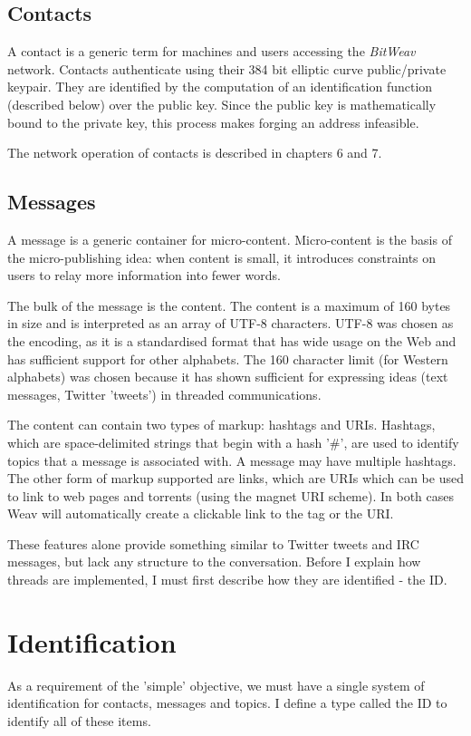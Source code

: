 \documentclass[10pt,a4paper,onecolumn]{article}
\begin{document}
\subsection{Contacts}
A contact is a generic term for machines and users accessing the \textit{BitWeav} network. Contacts authenticate using their 384 bit elliptic curve public/private keypair. They are identified by the computation of an identification function (described below) over the public key. Since the public key is mathematically bound to the private key, this process makes forging an address infeasible.

The network operation of contacts is described in chapters 6 and 7.

\subsection{Messages}
A message is a generic container for micro-content. Micro-content is the basis of the micro-publishing idea: when content is small, it introduces constraints on users to relay more information into fewer words.

The bulk of the message is the content. The content is a maximum of 160 bytes in size and is interpreted as an array of UTF-8 characters. UTF-8 was chosen as the encoding, as it is a standardised format that has wide usage on the Web and has sufficient support for other alphabets. The 160 character limit (for Western alphabets) was chosen because it has shown sufficient for expressing ideas (text messages, Twitter 'tweets') in threaded communications. 

The content can contain two types of markup: hashtags and URIs. Hashtags, which are space-delimited strings that begin with a hash '\#', are used to identify topics that a message is associated with. A message may have multiple hashtags. The other form of markup supported are links, which are URIs which can be used to link to web pages and torrents (using the magnet URI scheme). In both cases Weav will automatically create a clickable link to the tag or the URI.

These features alone provide something similar to Twitter tweets and IRC messages, but lack any structure to the conversation. Before I explain how threads are implemented, I must first describe how they are identified - the ID.

\section{Identification}
As a requirement of the 'simple' objective, we must have a single system of identification for contacts, messages and topics. I define a type called the ID to identify all of these items. 
\end{document}
